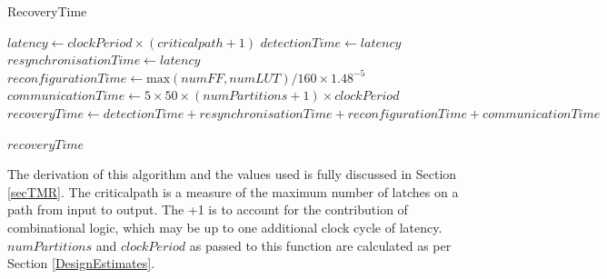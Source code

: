 \documentclass[12pt,final,oneside]{dwThesis} %
\begin{document}
\begin{algorithm}
\begin{center}
\begin{tabularx}
         \end{tabularx}

      \end{center}
      \caption{RecoveryTime}\label{recoverytime}

      \begin{algorithmic}[1]
         \State
         $latency \gets clockPeriod\times{}(criticalpath+1)$ 
         \State
         $detectionTime \gets latency$ 
         \State $resynchronisationTime \gets
         latency$ 
         \State $reconfigurationTime \gets \mbox{max}(numFF,
         numLUT)/160\times 1.48^{-5}$ 
         \State $communicationTime \gets 5\times
         50\times(numPartitions+1)\times clockPeriod$ 
         \State $recoveryTime
         \gets
         detectionTime+resynchronisationTime+reconfigurationTime+communicationTime$

         \Return $recoveryTime$ \EndProcedure 
      \end{algorithmic}


   \end{algorithm}
   The derivation of this algorithm and the values used is
   fully discussed in Section \ref{secTMR}. The criticalpath is a measure of
   the maximum number of latches on a path from input to output. The +1 is to
   account for the contribution of combinational logic, which may be up to one
   additional clock cycle of latency. $numPartitions$ and $clockPeriod$ as passed to this function are calculated as per Section \ref{DesignEstimates}.


   \newpage 
\end{document}
